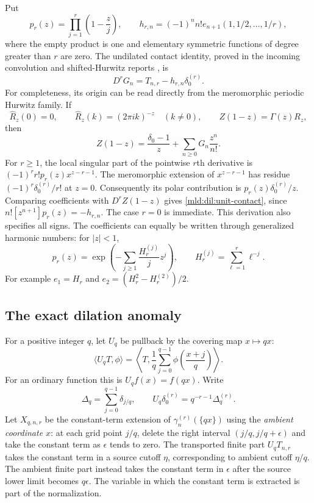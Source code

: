 Put
\begin{equation}
 p_r(z)=\prod_{j=1}^r\left(1-\frac zj\right),\qquad
 h_{r,n}=(-1)^n n!e_{n+1}(1,1/2,\ldots,1/r),
 \label{mld:dil:p-h}
\end{equation}
where the empty product is one and elementary symmetric functions of
degree greater than $r$ are zero.  The undilated contact identity, proved
in the incoming convolution and shifted-Hurwitz reports
\cite{IncomingConvolution,IncomingShifted}, is
\begin{equation}
 D^rG_n=T_{n,r}-h_{r,n}\delta_0^{(r)}.
 \label{mld:dil:unit-contact}
\end{equation}
For completeness, its origin can be read directly from the meromorphic
periodic Hurwitz family.  If
\[
 \widehat R_z(0)=0,\qquad
 \widehat R_z(k)=(2\pi i k)^{-z}\quad(k\ne0),
 \qquad Z(1-z)=\Gamma(z)R_z,
\]
then
\[
 Z(1-z)=\frac{\delta_0-1}{z}
            +\sum_{n\ge0}G_n\frac{z^n}{n!}.
\]
For $r\ge1$, the local singular part of the pointwise $r$th derivative
is $(-1)^r r!p_r(z)x^{z-r-1}$.  The meromorphic extension of
$x^{z-r-1}$ has residue $(-1)^r\delta_0^{(r)}/r!$ at $z=0$.
Consequently its polar contribution is
$p_r(z)\delta_0^{(r)}/z$.  Comparing coefficients with
$D^rZ(1-z)$ gives \eqref{mld:dil:unit-contact}, since
$n![z^{n+1}]p_r(z)=-h_{r,n}$.
The case $r=0$ is immediate.  This derivation also specifies all signs.
The coefficients can equally be written through generalized harmonic
numbers: for $|z|<1$,
\[
 p_r(z)=\exp\!\left(-\sum_{j\ge1}\frac{H_r^{(j)}}jz^j\right),
 \qquad H_r^{(j)}=\sum_{\ell=1}^r\ell^{-j}.
\]
For example $e_1=H_r$ and $e_2=(H_r^2-H_r^{(2)})/2$.

\subsection{The exact dilation anomaly}
For a positive integer $q$, let $U_q$ be pullback by the covering map
$x\mapsto qx$:
\[
 \langle U_qT,\phi\rangle
 =\left\langle T,\frac1q\sum_{j=0}^{q-1}
                         \phi\!\left(\frac{x+j}{q}\right)\right\rangle.
\]
For an ordinary function this is $U_qf(x)=f(qx)$.  Write
\[
 \Delta_q=\sum_{j=0}^{q-1}\delta_{j/q},\qquad
 U_q\delta_0^{(r)}=q^{-r-1}\Delta_q^{(r)}.
\]
Let $X_{q,n,r}$ be the constant-term extension of
$\gamma_n^{(r)}(\{qx\})$ using the \emph{ambient coordinate $x$}:
at each grid point $j/q$, delete the right interval
$(j/q,j/q+\epsilon)$ and take the constant term as $\epsilon$ tends to
zero. The transported finite part $U_qT_{n,r}$ takes the constant term
in a source cutoff $\eta$, corresponding to ambient cutoff $\eta/q$.
The ambient finite part instead takes the constant term in $\epsilon$
after the source lower limit becomes $q\epsilon$. The variable in which
the constant term is extracted is part of the normalization.

